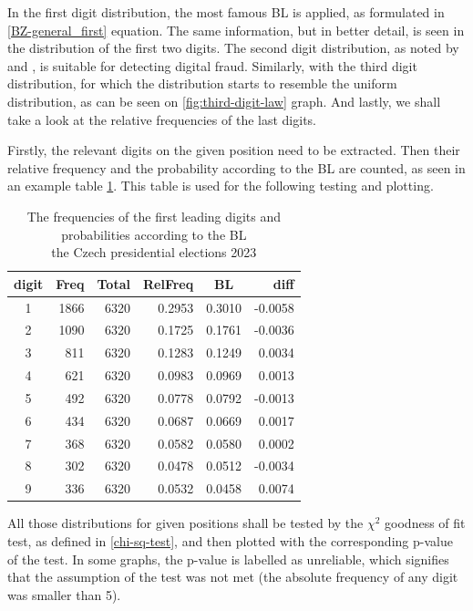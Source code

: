 In the first digit distribution, the most famous BL is applied, as formulated in \ref{BZ-general_first} equation. The same information, but in better detail, is seen in the distribution of the first two digits. The second digit distribution, as noted by \citeauthor{Beber2012} and \citeauthor{Mebane2011}, is suitable for detecting digital fraud. Similarly, with the third digit distribution, for which the distribution starts to resemble the uniform distribution, as can be seen on \ref{fig:third-digit-law} graph. And lastly, we shall take a look at the relative frequencies of the last digits.

Firstly, the relevant digits on the given position need to be extracted. Then their relative frequency and the probability according to the BL are counted, as seen in an example table \ref{table:BL-table}. This table is used for the following testing and plotting.  

\begin{table}[h]
\centering
    \caption{The frequencies of the first leading digits and probabilities according to the BL \\the Czech presidential elections 2023}
    \begin{tabular}{c|rrrcr}
        \hline
        digit & Freq & Total & RelFreq & BL     & diff    \\ \hline
        1     & 1866 & 6320  & 0.2953  & 0.3010 & -0.0058 \\
        2     & 1090 & 6320  & 0.1725  & 0.1761 & -0.0036 \\
        3     & 811  & 6320  & 0.1283  & 0.1249 & 0.0034  \\
        4     & 621  & 6320  & 0.0983  & 0.0969 & 0.0013  \\
        5     & 492  & 6320  & 0.0778  & 0.0792 & -0.0013 \\
        6     & 434  & 6320  & 0.0687  & 0.0669 & 0.0017  \\
        7     & 368  & 6320  & 0.0582  & 0.0580 & 0.0002  \\
        8     & 302  & 6320  & 0.0478  & 0.0512 & -0.0034 \\
        9     & 336  & 6320  & 0.0532  & 0.0458 & 0.0074  \\ \hline
    \end{tabular}
    \label{table:BL-table}
\end{table}

All those distributions for given positions shall be tested by the $\chi^2$ goodness of fit test, as defined in \ref{chi-sq-test}, and then plotted with the corresponding p-value of the test. In some graphs, the p-value is labelled as unreliable, which signifies that the assumption of the test was not met (the absolute frequency of any digit was smaller than 5). 

